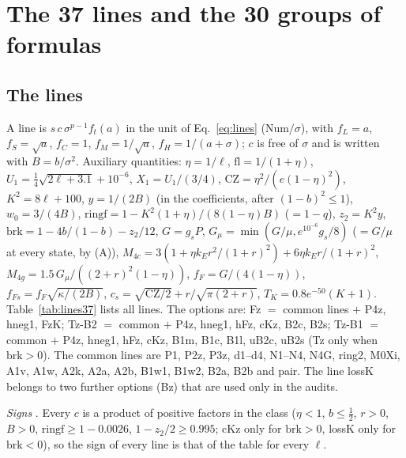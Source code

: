 \section{The 37 lines and the 30 groups of formulas}
\label{app:B}

\subsection{The lines}

A line is $s\,c\,\sigma^{p-1}f_t(a)$ in the unit of Eq.~\eqref{eq:lines} (Num$/\sigma$), with $f_L=a$, $f_S=\sqrt a$, $f_C=1$, $f_M=1/\sqrt a$, $f_H=1/(a+\sigma)$; $c$ is free of $\sigma$ and is written with $B=b/\sigma^2$.
Auxiliary quantities: $\eta=1/\ell$, $\mathrm{fl}=1/(1+\eta)$, $U_1=\frac14\sqrt{2\ell+3.1}+10^{-6}$, $X_1=U_1/(3/4)$, $\mathrm{CZ}=\eta^2/(e(1-\eta)^2)$, $K^2=8\ell+100$, $y=1/(2B)$ (in the coefficients, after $(1-b)^2\le1$), $w_0=3/(4B)$, $\mathrm{ringf}=1-K^2(1+\eta)/(8(1-\eta)B)$ ($=1-q$), $z_2=K^2y$, $\mathrm{brk}=1-4b/(1-b)-z_2/12$, $G=g_sP$, $G_\mu=\min(G/\mu,e^{10^{-6}}g_s/8)$ ($=G/\mu$ at every state, by (A)), $M_{4c}=3(1+\eta k_Er^2/(1+r)^2)+6\eta k_Er/(1+r)^2$, $M_{4g}=1.5\,G_\mu/((2+r)^2(1-\eta))$, $f_F=G/(4(1-\eta))$, $f_{Fs}=f_F\sqrt{\kappa/(2B)}$, $c_s=\sqrt{\mathrm{CZ}/2}+r/\sqrt{\pi(2+r)}$, $T_K=0.8e^{-50}(K+1)$.
Table~\ref{tab:lines37} lists all lines.
The options are: Fz $=$ common lines $+$ P4z, hneg1, FzK; Tz-B2 $=$ common $+$ P4z, hneg1, hFz, cKz, B2c, B2s; Tz-B1 $=$ common $+$ P4z, hneg1, hFz, cKz, B1m, B1c, B1l, uB2c, uB2s (Tz only when $\mathrm{brk}>0$).
The common lines are P1, P2z, P3z, d1--d4, N1--N4, N4G, ring2, M0Xi, A1v, A1w, A2k, A2a, A2b, B1w1, B1w2, B2a, B2b and pair.
The line lossK belongs to two further options (Bz) that are used only in the audits.

\emph{Signs} \proofst. Every $c$ is a product of positive factors in the class ($\eta<1$, $b\le\frac12$, $r>0$, $B>0$, $\mathrm{ringf}\ge1-0.0026$, $1-z_2/2\ge0.995$; cKz only for $\mathrm{brk}>0$, lossK only for $\mathrm{brk}<0$), so the sign of every line is that of the table for every $\ell$.

